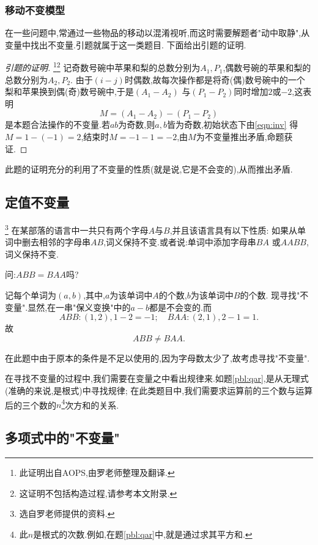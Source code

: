 \subsubsection{移动不变模型}
在一些问题中,常通过一些物品的移动以混淆视听,而这时需要解题者"动中取静",从变量中找出不变量.引题就属于这一类题目.
下面给出引题的证明.
\begin{proof}[引题的证明]\footnote{此证明出自AOPS,由罗老师整理及翻译.}\footnote{这证明不包括构造过程,请参考本文附录.}
    记奇数号碗中苹果和梨的总数分别为$A_1,P_1$,偶数号碗的苹果和梨的总数分别为$A_2,P_2$.
    由于$(i-j)$时偶数,故每次操作都是将奇(偶)数号碗中的一个梨和苹果换到偶(奇)数号碗中,于是$(A_1-A_2)$
    与$(P_1-P_2)$同时增加$2$或$-2$,这表明\begin{equation}
        M=(A_1-A_2)-(P_1-P_2)\label{eqn:inv}
    \end{equation}
    是本题合法操作的不变量.若$ab$为奇数,则$a,b$皆为奇数,初始状态下由\eqref{eqn:inv}
    得$M=1-(-1)=2$,结束时$M=-1-1=-2$,由$M$为不变量推出矛盾,命题获证.
    \end{proof}
    
    此题的证明充分的利用了不变量的性质(就是说,它是不会变的),从而推出矛盾.
\subsection{定值不变量}
\begin{problem}\footnote{选自罗老师提供的资料.}
    在某部落的语言中一共只有两个字母$A$与$B$,并且该语言具有以下性质:
    如果从单词中删去相邻的字母串$AB$,词义保持不变.或者说:单词中添加字母串$BA$
    或$AABB$,词义保持不变.
 
    问:$ABB=BAA$吗?
\end{problem}
\begin{solution}
    记每个单词为$(a,b)$,其中,$a$为该单词中$A$的个数,$b$为该单词中$B$的个数.
    现寻找"不变量".显然,在一串"保义变换"中的$a-b$都是不会变的.而$$ABB:(1,2),1-2=-1;\quad BAA:(2,1),2-1=1.$$
    故$$ABB\neq BAA.$$
\end{solution}
在此题中由于原本的条件是不足以使用的,因为字母数太少了,故考虑寻找"不变量".

在寻找不变量的过程中,我们需要在变量之中看出规律来.如题\ref{pbl:qar},是从无理式(准确的来说,是根式)中寻找规律;
在此类题目中,我们需要求运算前的三个数与运算后的三个数的$n$\footnote{此$n$是根式的次数.例如,在题\ref{pbl:qar}中,就是通过求其平方和.}次方和的关系.
\subsection{多项式中的"不变量"}

